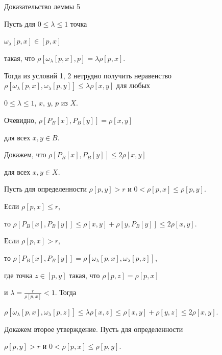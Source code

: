 \begin{pf*}{Доказательство леммы 5}


Пусть для $0 \leq \lambda \leq 1$ точка 


$\omega_{\lambda}[p,x] \in [p,x]$


такая, что $\rho [\omega_{\lambda}[p,x],p] = \lambda \rho [p,x]$.


Тогда из условий 1, 2 нетрудно получить неравенство\\


$\rho [\omega_{\lambda}[p,x],\omega_{\lambda}[p,y]]


\leq \lambda \rho [x,y]$ для любых 


$0 \leq \lambda \leq 1$, $x$, $y$, $p$ из $X$. 





Очевидно, $\rho [P_{B}[x],P_{B}[y]] = \rho [x,y]$


для всех $x, y \in B$.


Докажем, что $\rho [P_{B}[x],P_{B}[y]] \leq 2\rho [x,y]$


для всех $x, y \in X$.


Пусть для определенности $\rho [p,y] > r$ и $0 < \rho [p,x] \leq \rho [p,y]$. 





Если $\rho [p,x] \leq r$,


то $\rho [P_{B}[x],P_{B}[y]] \leq \rho [x,y] +


\rho [y,P_{B}[y]] \leq 2\rho [x,y]$.


Если $\rho [p,x] > r$,


то $\rho [P_{B}[x],P_{B}[y]] = \rho [\omega_{\lambda}[p,x],


\omega_{\lambda}[p,z]]$,


где точка $z \in [p,y]$ такая, что $\rho [p,z] = \rho [p,x]$


и $\lambda =\frac{r}{\rho [p,x]} < 1$. Тогда 


$\rho [\omega_{\lambda}[p,x],\omega_{\lambda}[p,z]] \leq


\lambda\rho [x,z] \leq \rho [x,y] + \rho [y,z]


\leq 2\rho [x,y]$. 





Докажем второе утверждение. Пусть для определенности


$\rho [p,y] > r$ и $0 < \rho [p,x] \leq \rho [p,y]$. 






\end{pf*}
